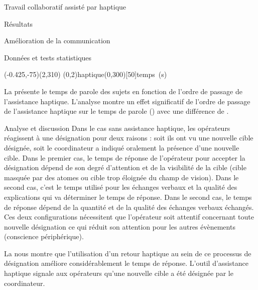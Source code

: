 \documentclass[myfrancais,ngerman,english,french]{mythesis}
\begin{document}
\begin{mychapter}{Travail collaboratif assisté par haptique}
\begin{mysection}{Résultats}
\begin{mysubsection}{Amélioration de la communication}
\begin{mysubsubsection}{Données et tests statistiques}
					\begin{myfigure}
						\begin{myps}(-0.425,-75)(2,310)
							\myaxes(0,2){haptique}(0,300)[50]{temps~(s)}
						\end{myps}
					\end{myfigure}

					La  présente le temps de parole des sujets  en fonction de l'ordre de passage de l'assistance haptique.
					L'analyse montre un effet significatif de l'ordre de passage de l'assistance haptique sur le temps de parole  () avec une différence de .
				\end{mysubsubsection}
				\begin{mysubsubsection}{Analyse et discussion}
					Dans le cas sans assistance haptique, les opérateurs réagissent à une désignation pour deux raisons : soit ils ont vu une nouvelle cible désignée, soit le coordinateur a indiqué oralement la présence d'une nouvelle cible.
					Dans le premier cas, le temps de réponse de l'opérateur pour accepter la désignation dépend de son degré d'attention et de la visibilité de la cible (cible masquée par des atomes ou cible trop éloignée du champ de vision).
					Dans le second cas, c'est le temps utilisé pour les échanges verbaux et la qualité des explications qui va déterminer le temps de réponse.
					Dans le second cas, le temps de réponse dépend de la quantité et de la qualité des échanges verbaux échangés.
					Ces deux configurations nécessitent que l'opérateur soit attentif concernant toute nouvelle désignation ce qui réduit son attention pour les autres évènements (conscience périphérique).

					La  nous montre que l'utilisation d'un retour haptique au sein de ce processus de désignation améliore considérablement le temps de réponse.
					L'outil d'assistance haptique signale aux opérateurs qu'une nouvelle cible a été désignée par le coordinateur.


\end{mysubsubsection}
\end{mysubsection}
\end{mysection}
\end{mychapter}
\end{document}
